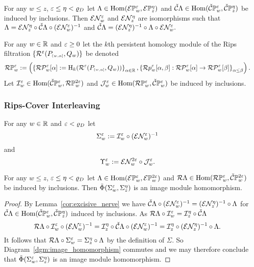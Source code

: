 \begin{lemma}\label{cor:excisive_nerve}
  For any $w\leq z$, $\e\leq \eta < \varrho_D$ let $\Lambda\in\Hom(\E\PP{w}{\e},\E\PP{z}{\eta})$ and $\cech\Lambda\in\Hom(\CPP{w}{\e},\CPP{z}{\eta})$ be induced by inclusions.
  Then $\E\N_w^\e$ and $\E\N_z^\eta$ are isomorphisms such that $\Lambda = \E\N_{z}^{\eta}\circ \cech\Lambda\circ (\E\N_w^\e)^{-1}$ and $\cech\Lambda = (\E\N_{z}^{\eta})^{-1}\circ \Lambda\circ \E\N_w^\e.$
\end{lemma}

For any $w\in\R$ and $\e\geq 0$ let the $k$th persistent homology module of the Rips filtration $\{\rips^\e(P\subi{w,\alpha}, Q_w)\}$ be denoted
\[\RPP{w}{\e} := \left(\left\{\RP{w}{\e}{\alpha} := \hom_k(\rips^\e(P\subi{w,\alpha}, Q_w))\right\}_{\alpha\in\R}, \left\{\rips p_w^\e[\alpha,\beta] : \RP{w}{\e}{\alpha}\to\RP{w}{\e}{\beta}\right\}_{\alpha\leq\beta}\right).\]
Let $\I_w^\e\in\Hom(\CPP{w}{\e}, \RPP{w}{2\e})$ and $\J_w^\e\in\Hom(\RPP{w}{\e},\CPP{w}{\e})$ be induced by inclusions.

\subsubsection{Rips-Cover Interleaving}

For any $w\in\R$ and $\e < \varrho_D$ let
\[\Sigma_w^\e := \I_w^\e\circ (\E\N_w^\e)^{-1}\]
and
\[\Upsilon_w^\e := \E\N_w^{2\e}\circ \J_w^{\e}.\]

\begin{lemma}\label{lem:rips_homomorphism_left}
  For any $w\leq z$, $\e\leq\eta < \varrho_D$ let $\Lambda\in\Hom(\ext{\PP{w}{\e}}, \ext{\PP{w}{2\e}})$ and $\rips\Lambda\in\Hom(\RPP{w}{\e},\CPP{w}{2\e})$ be induced by inclusions.
  Then $\tilde{\Phi}(\Sigma_w^\e,\Sigma_z^\eta)$ is an image module homomorphism.
\end{lemma}
\begin{proof}
  By Lemma~\ref{cor:excisive_nerve} we have $\cech\Lambda\circ (\E\N_w^\e)^{-1} = (\E\N_z^\eta)^{-1}\circ \Lambda$ for $\cech\Lambda\in\Hom(\CPP{w}{\e},\CPP{z}{\eta})$ induced by inclusions.
  As $\rips\Lambda\circ\I_w^\e = \I_z^\eta\circ\cech\Lambda$
  \[ \rips\Lambda\circ \I_w^\e\circ(\E\N_w^\e)^{-1} = \I_z^\eta\circ\cech\Lambda\circ (\E\N_w^\e)^{-1} = \I_z^\eta\circ (\E\N_z^\eta)^{-1}\circ\Lambda.\]
  It follows that $\rips\Lambda\circ\Sigma_w^\e = \Sigma_z^\eta\circ\Lambda$ by the definition of $\Sigma$.
  So Diagram~\ref{dgm:image_homomorphism} commutes and we may therefore conclude that $\tilde{\Phi}(\Sigma_w^\e,\Sigma_z^\eta)$ is an image module homomorphism.
\end{proof}

